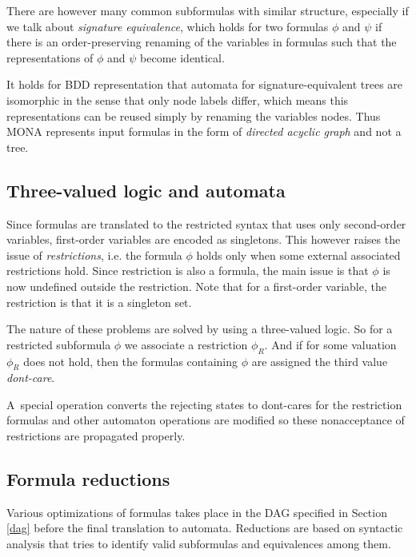 There are however many common subformulas with similar structure, especially if we talk about \emph{signature equivalence}, which holds for two formulas $\phi$ and $\psi$ if there is an order-preserving renaming of the variables in formulas such that the representations of $\phi$ and $\psi$ become identical.

It holds for BDD representation that automata for signature-equivalent trees are isomorphic in the sense that only node labels differ, which means this representations can be reused simply by renaming the variables nodes. Thus MONA represents input formulas in the form of \emph{directed acyclic graph} and not a tree. 

\subsection{Three-valued logic and automata}
Since formulas are translated to the restricted syntax that uses only second-order variables, first-order variables are encoded as singletons. This however raises the issue of \emph{restrictions}, i.e. the formula $\phi$ holds only when some external associated restrictions hold. Since restriction is also a formula, the main issue is that $\phi$ is now undefined outside the restriction. Note that for a first-order variable, the restriction is that it is a singleton set. 

The nature of these problems are solved by using a three-valued logic. So for a restricted subformula $\phi$ we associate a restriction $\phi_R$. And if for some valuation $\phi_R$ does not hold, then the formulas containing $\phi$ are assigned the third value \emph{dont-care}.

A~special operation converts the rejecting states to dont-cares for the restriction formulas and other automaton operations are modified so these nonacceptance of restrictions are propagated properly. 

\subsection{Formula reductions}
Various optimizations of formulas takes place in the DAG specified in Section \ref{dag} before the final translation to automata. Reductions are based on syntactic analysis that tries to identify valid subformulas and equivalences among them. 


